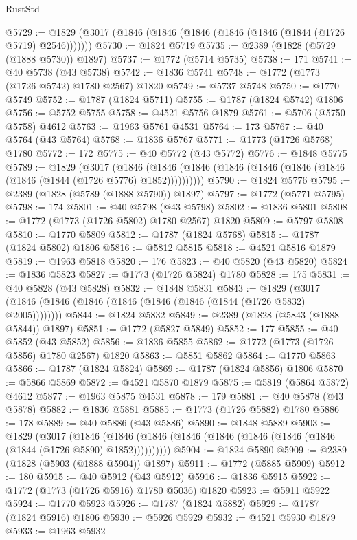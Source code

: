 \begin{lexlean}{RustStd}
\begin{coremodule}
@5729 := @1829 (@3017 (@1846 (@1846 (@1846 (@1846 (@1846 (@1844 (@1726 @5719) @2546)))))))
@5730 := @1824 @5719
@5735 := @2389 (@1828 (@5729 (@1888 @5730)) @1897)
@5737 := @1772 (@5714 @5735)
@5738 := 171
@5741 := @40 @5738 (@43 @5738)
@5742 := @1836 @5741
@5748 := @1772 (@1773 (@1726 @5742) @1780 @2567) @1820
@5749 := @5737 @5748
@5750 := @1770 @5749
@5752 := @1787 (@1824 @5711)
@5755 := @1787 (@1824 @5742) @1806
@5756 := @5752 @5755
@5758 := @4521 @5756 @1879
@5761 := @5706 (@5750 @5758) @4612
@5763 := @1963 @5761 @4531
@5764 := 173
@5767 := @40 @5764 (@43 @5764)
@5768 := @1836 @5767
@5771 := @1773 (@1726 @5768) @1780
@5772 := 172
@5775 := @40 @5772 (@43 @5772)
@5776 := @1848 @5775
@5789 := @1829
    (@3017
      (@1846 (@1846 (@1846 (@1846 (@1846 (@1846 (@1846 (@1846 (@1844 (@1726 @5776) @1852))))))))))
@5790 := @1824 @5776
@5795 := @2389 (@1828 (@5789 (@1888 @5790)) @1897)
@5797 := @1772 (@5771 @5795)
@5798 := 174
@5801 := @40 @5798 (@43 @5798)
@5802 := @1836 @5801
@5808 := @1772 (@1773 (@1726 @5802) @1780 @2567) @1820
@5809 := @5797 @5808
@5810 := @1770 @5809
@5812 := @1787 (@1824 @5768)
@5815 := @1787 (@1824 @5802) @1806
@5816 := @5812 @5815
@5818 := @4521 @5816 @1879
@5819 := @1963 @5818
@5820 := 176
@5823 := @40 @5820 (@43 @5820)
@5824 := @1836 @5823
@5827 := @1773 (@1726 @5824) @1780
@5828 := 175
@5831 := @40 @5828 (@43 @5828)
@5832 := @1848 @5831
@5843 := @1829 (@3017 (@1846 (@1846 (@1846 (@1846 (@1846 (@1846 (@1844 (@1726 @5832) @2005))))))))
@5844 := @1824 @5832
@5849 := @2389 (@1828 (@5843 (@1888 @5844)) @1897)
@5851 := @1772 (@5827 @5849)
@5852 := 177
@5855 := @40 @5852 (@43 @5852)
@5856 := @1836 @5855
@5862 := @1772 (@1773 (@1726 @5856) @1780 @2567) @1820
@5863 := @5851 @5862
@5864 := @1770 @5863
@5866 := @1787 (@1824 @5824)
@5869 := @1787 (@1824 @5856) @1806
@5870 := @5866 @5869
@5872 := @4521 @5870 @1879
@5875 := @5819 (@5864 @5872) @4612
@5877 := @1963 @5875 @4531
@5878 := 179
@5881 := @40 @5878 (@43 @5878)
@5882 := @1836 @5881
@5885 := @1773 (@1726 @5882) @1780
@5886 := 178
@5889 := @40 @5886 (@43 @5886)
@5890 := @1848 @5889
@5903 := @1829
    (@3017
      (@1846 (@1846 (@1846 (@1846 (@1846 (@1846 (@1846 (@1846 (@1844 (@1726 @5890) @1852))))))))))
@5904 := @1824 @5890
@5909 := @2389 (@1828 (@5903 (@1888 @5904)) @1897)
@5911 := @1772 (@5885 @5909)
@5912 := 180
@5915 := @40 @5912 (@43 @5912)
@5916 := @1836 @5915
@5922 := @1772 (@1773 (@1726 @5916) @1780 @5036) @1820
@5923 := @5911 @5922
@5924 := @1770 @5923
@5926 := @1787 (@1824 @5882)
@5929 := @1787 (@1824 @5916) @1806
@5930 := @5926 @5929
@5932 := @4521 @5930 @1879
@5933 := @1963 @5932

\end{coremodule}
\end{lexlean}
